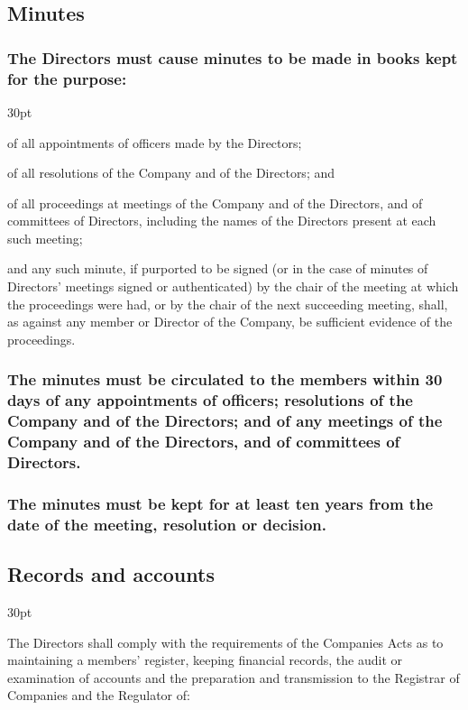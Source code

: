 \documentclass[12pt]{article}
\def\clauseindent{30pt}
\newenvironment{subindentpara}{\begin{adjustwidth}{\clauseindent}{}\begin{hanginglist}}{\end{hanginglist}\end{adjustwidth}}
\begin{document}
\subsection{Minutes}
\subsubsection{The Directors must cause minutes to be made in books kept for the purpose:}
\begin{subindentpara}
    \item of all appointments of officers made by the Directors;
    \item of all resolutions of the Company and of the Directors; and
    \item of all proceedings at meetings of the Company and of the Directors, and of committees of Directors, including the names of the Directors present at each such meeting;
    \item and any such minute, if purported to be signed (or in the case of minutes of Directors’ meetings signed or authenticated) by the chair of the meeting at which the proceedings were had, or by the chair of the next succeeding meeting, shall, as against any member or Director of the Company, be sufficient evidence of the proceedings.
\end{subindentpara}
\subsubsection{The minutes must be circulated to the members within 30 days of any appointments of officers; resolutions of the Company and of the Directors; and of any meetings of the Company and of the Directors, and of committees of Directors.}
\subsubsection{The minutes must be kept for at least ten years from the date of the meeting, resolution or decision.}

\subsection{Records and accounts}
\begin{subindentpara}
    \item The Directors shall comply with the requirements of the Companies Acts as to maintaining a members’ register, keeping financial records, the audit or examination of accounts and the preparation and transmission to the Registrar of Companies and the Regulator of:
\end{subindentpara}
\end{document}
